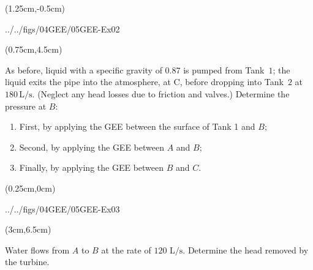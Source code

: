 \documentclass[9pt,xcolor={svgnames, x11names},professionalfonts, mathserif]{beamer}
\begin{document}
\begin{frame}
	\begin{textblock*}{1\textwidth}(1.25cm,-0.5cm)
		\begin{cfig}[0.275]{../../figs/04GEE/05GEE-Ex02}\end{cfig}
	\end{textblock*}
	\begin{textblock*}{1.05\textwidth}(0.75cm,4.5cm)
		\centering
		\begin{myexer}[colframe=example, colbacktitle=example!80!white, width=0.92\textwidth]{}{}
			\raggedright
			\vspace{-0.125cm}
			As before, liquid with a specific gravity of 0.87 is pumped from Tank~$1$; the liquid exits the pipe into the atmosphere, at C, before dropping into Tank~$2$ at 	$180\,\text{L/s}$. (Neglect any head losses  due to friction and valves.) \parm
			Determine the pressure at $B$:
			\begin{enumerate}
				\item First, by applying the GEE between the surface of Tank 1 and $B$;
				\item Second, by applying the GEE between $A$ and $B$;
				\item Finally, by applying the GEE between $B$ and $C$.
			\end{enumerate}
		\end{myexer}
	\end{textblock*}
\end{frame}

\begin{frame}
	\begin{textblock*}{1\textwidth}(0.25cm,0cm)
		\begin{cfig}[0.5]{../../figs/04GEE/05GEE-Ex03}\end{cfig}
	\end{textblock*}
	\begin{textblock*}{0.8\textwidth}(3cm,6.5cm)
		\begin{myexam}[colframe=example, colbacktitle=example!80!white, width=0.85\textwidth]{}{}
			Water flows from $A$ to $B$ at the rate of $120\text{ L/s}$.\parm
			Determine the head removed by the turbine.
		\end{myexam}
	\end{textblock*}
\end{frame}
\end{document}
